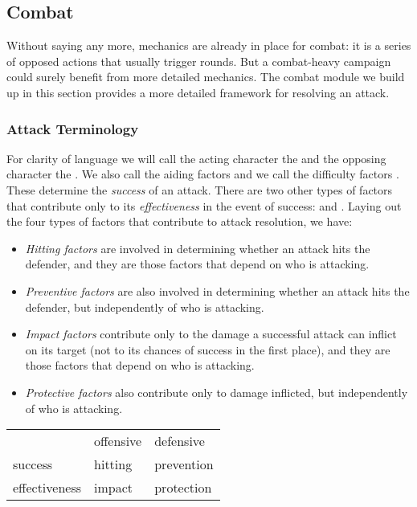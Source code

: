 \subsection{Combat}\label{sec:qombat}

\def\NDF{\Delta}
\def\ODF{d}
\def\ODFA{d_A}
\def\ODFM{d_M}
\def\DDF{\ODF'}
\def\DDFA{\ODFA'}
\def\DDFM{\ODFM'}


Without saying any more, mechanics are already in place for combat:
it is a series of opposed actions that usually trigger rounds.
But a combat-heavy campaign could surely benefit from more detailed mechanics.
The combat module we build up in this section provides
a more detailed framework for resolving an attack.

\subsubsection{Attack Terminology}
For clarity of language we will call the acting character the 
and the opposing character the .
We also call the aiding factors  and we call the difficulty factors
.
These determine the \emph{success} of an attack. There are two other types of factors that
contribute only to its \emph{effectiveness} in the event of success:
 and .
Laying out the four types of factors that contribute to attack resolution, we have:
\vspace{-1em}\begin{itemize}
\item \emph{Hitting factors} are involved in determining whether an attack hits the defender,
and they are those factors that depend on who is attacking.
\item \emph{Preventive factors} are also involved in determining whether an attack hits the defender,
but independently of who is attacking. 
\item \emph{Impact factors} contribute only to the damage a successful attack can inflict on its target
(not to its chances of success in the first place),
and they are those factors that depend on who is attacking.
\item \emph{Protective factors} also contribute only to damage inflicted,
but independently of who is attacking.
\end{itemize}
\begin{center}\begin{tabular}{l|ll}
              & offensive & defensive  \\
\cline{1-3}
success       & hitting   & prevention \\
effectiveness & impact    & protection 
\end{tabular}\end{center}
